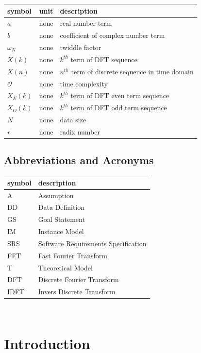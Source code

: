 \documentclass[12pt]{article}
\newcommand{\famname}{FFT}
\begin{document}
\noindent \begin{longtable*}{l l p{12cm}} \toprule \textbf{symbol} &
\textbf{unit} & \textbf{description}\\ \midrule
 $a$ & none & real number term\\ 
$b$ &none & coefficient of complex number term\\
$\omega_N$&none&twiddle factor\\
$X(k)$&none&$k^{th}$ term of DFT sequence\\
$X(n)$&none&$n^{th}$ term of discrete sequence in time domain\\
$\mathcal{O}$&none&time complexity\\
$X_{E}(k)$&none&$k^{th}$ term of DFT even term sequence\\
$X_{O}(k)$&none&$k^{th}$ term of DFT odd term sequence\\
$N$&none&data size\\
$r$&none&radix number\\
 \bottomrule
\end{longtable*}


\subsection{Abbreviations and Acronyms}

\renewcommand{\arraystretch}{1.2} \begin{tabular}{l l} \toprule \textbf{symbol}
& \textbf{description}\\ \midrule A & Assumption\\ DD & Data Definition\\ GS &
Goal Statement\\ IM & Instance Model\\ SRS & Software Requirements
Specification\\ \famname{} & Fast Fourier Transform\\ T & Theoretical Model\\
DFT & Discrete Fourier Transform\\ IDFT & Invers Discrete Transform\\
\bottomrule \end{tabular}\\


\section{Introduction}
\end{document}
